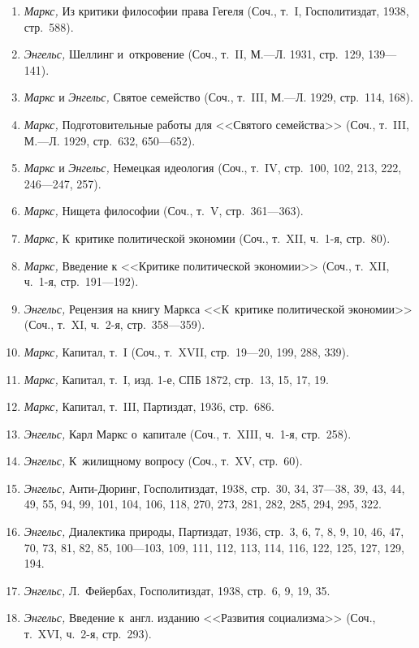 \begin{enumerate}
\item {\em Маркс,} Из критики философии права Гегеля (Соч., т.~I,
Госполитиздат, 1938, стр.~588).
\item {\em Энгельс,} Шеллинг и~откровение (Соч., т.~II, М.---Л. 1931,
стр.~129, 139---141).
\item {\em Маркс} и {\em Энгельс,} Святое семейство (Соч., т.~III, М.---Л.
1929, стр.~114, 168).
\item {\em Маркс,} Подготовительные работы для <<Святого семейства>> (Соч.,
т.~III, М.---Л. 1929, стр.~632, 650---652).
\item {\em Маркс} и {\em Энгельс,}
Немецкая идеология (Соч., т.~IV, стр.~100, 102, 213, 222, 246---247, 257).
\item {\em Маркс,} Нищета философии (Соч., т.~V, стр.~361---363).
\item {\em Маркс,} К~критике политической экономии (Соч., т.~XII, ч.~1-я,
стр.~80).
\item {\em Маркс,} Введение к <<Критике политической экономии>> (Соч., т.~XII,
ч.~1-я, стр.~191---192).
\item {\em Энгельс,} Рецензия на книгу Маркса <<К~критике политической
экономии>> (Соч., т.~XI, ч.~2-я, стр.~358---359).
\item {\em Маркс,} Капитал, т.~I (Соч., т.~XVII, стр.~19---20, 199, 288, 339).
\item {\em Маркс,} Капитал, т.~I, изд. 1-е, СПБ 1872, стр.~13, 15, 17, 19.
\item {\em Маркс,} Капитал, т.~III, Партиздат, 1936, стр.~686.
\item {\em Энгельс,} Карл Маркс о~капитале (Соч., т.~XIII, ч.~1-я, стр.~258).
\item {\em Энгельс,} К~жилищному вопросу (Соч., т.~XV, стр.~60).
\item {\em Энгельс,} Анти-Дюринг, Госполитиздат, 1938, стр.~30, 34, 37---38,
39, 43, 44, 49, 55, 94, 99, 101, 104, 106, 118, 270, 273, 281, 282, 285, 294,
295, 322.
\item {\em Энгельс,} Диалектика природы, Партиздат, 1936, стр.~3, 6, 7, 8, 9, 10,
46, 47, 70, 73, 81, 82, 85, 100---103, 109, 111, 112, 113, 114, 116, 122,
125, 127, 129, 194.
\item {\em Энгельс,} Л.~Фейербах, Госполитиздат, 1938, стр.~6, 9, 19, 35.
\item {\em Энгельс,} Введение к~англ. изданию <<Развития социализма>> (Соч.,
т.~XVI, ч.~2-я, стр.~293).
\end{enumerate}

